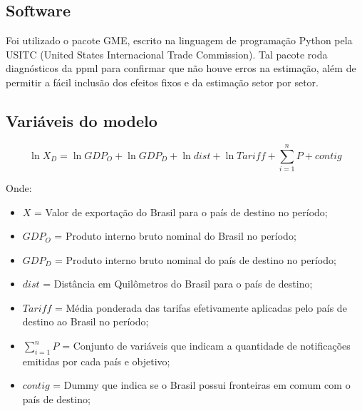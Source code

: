\documentclass[12pt, a4paper]{article}
\begin{document}
\subsection{Software}
Foi utilizado o pacote GME, escrito na linguagem de programação Python pela USITC (United States Internacional Trade Commission). Tal pacote roda diagnósticos da ppml para confirmar que não houve erros na estimação, além de permitir a fácil inclusão dos efeitos fixos e da estimação setor por setor.

\subsection{Variáveis do modelo}

\begin{equation}
    \ln X_{D} = 
    \ln GDP_{O} 
    + \ln GDP_{D} 
    + \ln dist 
    + \ln Tariff 
    + \sum_{i=1}^{n} P 
    + contig 
\end{equation}

Onde:

\begin{itemize}
    \item $X$ = Valor de exportação do Brasil para o país de destino no período;
    \item $GDP_{O}$ = Produto interno bruto nominal do Brasil no período;
    \item $GDP_{D}$ = Produto interno bruto nominal do país de destino no período;
    \item $dist$ = Distância em Quilômetros  do Brasil para o país de destino;
    \item $Tariff$ = Média ponderada das tarifas efetivamente aplicadas pelo país de destino ao Brasil no período;
    \item $\sum_{i=1}^{n} P$ = Conjunto de variáveis que indicam a quantidade de notificações emitidas por cada país e objetivo;
    \item $contig$ = Dummy que indica se o Brasil possui fronteiras em comum com o país de destino;
\end{itemize}
\end{document}
